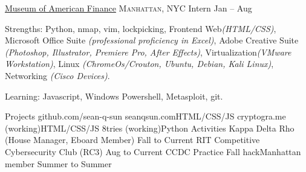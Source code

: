 \documentclass[10pt,a4paper]{article}
\begin{document}
\headedsection  %
  {\href{http://www.moaf.org/about/people/meyers_chris}{Museum of American Finance}}
  {\textsc{Manhattan, NYC}} {
  \headedsubsection
    {Intern}
    {Jan  -- Aug }
    {}
}

\spacedhrule{0em}{-0.4em}

\inlineheadsection  %
  {Strengths:}
  {Python, nmap, vim, lockpicking, Frontend Web\emph{(HTML/CSS)}, Microsoft Office Suite \emph{(professional proficiency in Excel)}, Adobe Creative Suite \emph{(Photoshop, Illustrator, Premiere Pro, After Effects)}, Virtualization\emph{(VMware Workstation)}, Linux \emph{(ChromeOs/Crouton, Ubuntu, Debian, Kali Linux)}, Networking \emph{(Cisco Devices)}.}

\nobreakvspace{.3em}
\inlineheadsection
  {Learning:}
  {Javascript, Windows Powershell, Metasploit, git.}

\nobreakvspace{1em}

\spacedhrule{0em}{-0.4em}
\headedsection 
  {Projects}
  {github.com/sean-q-sun} {
  \headedsubsection
    {seanqsun.com}{HTML/CSS/JS}
    {}
  \headedsubsection
    {cryptogra.me (working)}{HTML/CSS/JS}
    {}
  \headedsubsection
    {8tries (working)}{Python}
    {}
}
\headedsection
  {Activities}{}
  {
  \headedsubsection
  {Kappa Delta Rho (House Manager, Eboard Member)}
  {Fall  to Current}{}
  \headedsubsection
  {RIT Competitive Cybersecurity Club (RC3)}
  {Aug  to Current}{}
    \headedsubsection
  {CCDC Practice}
  {Fall }{}
  \headedsubsection
  {hackManhattan member}
  {Summer  to Summer }{}
}
\end{document}
